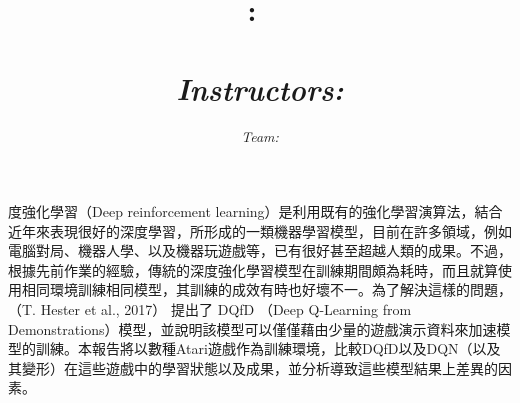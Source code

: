 \documentclass{article}
\title{
   \vspace{-1.5cm}
  \hmwkClass:\ \hmwkTitle\\
  \textbf{\hmwkTopic} \\
  \vspace{0.1in}\large{\textit{Instructors: \hmwkClassInstructor}}
}
\author{
    \textit{Team: \textbf{\hmwkTeam}}
}
\date{}
\begin{document}
\maketitle
\thispagestyle{empty}
\thispagestyle{fancy}
{}

\lettrine[findent=1pt]{}{ }度強化學習（Deep reinforcement learning）是利用既有的強化學習演算法，結合近年來表現很好的深度學習，所形成的一類機器學習模型，目前在許多領域，例如電腦對局、機器人學、以及機器玩遊戲等，已有很好甚至超越人類的成果。不過，根據先前作業的經驗，傳統的深度強化學習模型在訓練期間頗為耗時，而且就算使用相同環境訓練相同模型，其訓練的成效有時也好壞不一。為了解決這樣的問題，（T. Hester et al., 2017）\cite{DBLP:journals/corr/HesterVPLSPSDOA17} 提出了 DQfD （Deep Q-Learning from Demonstrations）模型，並說明該模型可以僅僅藉由少量的遊戲演示資料來加速模型的訓練。本報告將以數種Atari遊戲作為訓練環境，比較DQfD以及DQN（以及其變形）在這些遊戲中的學習狀態以及成果，並分析導致這些模型結果上差異的因素。
\end{document}
